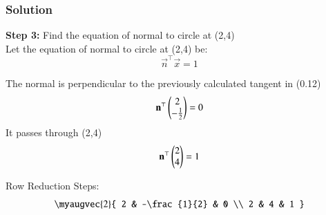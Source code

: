 \documentclass{beamer}
\numberwithin{equation}{section}
\begin{document}
\begin{frame}[fragile]
    \frametitle{Solution}
\textbf{Step 3:} Find the equation of normal to circle at (2,4)\\
Let the equation of normal to circle at (2,4) be:
\begin{equation}
\vec{n}^\top\vec{x} = 1
\end{equation}

The normal is perpendicular to the previously calculated tangent in (0.12)
\begin{equation}
\mathbf{n}^\top \begin{pmatrix}2 \\ -\frac{1}{2}\end{pmatrix} = 0
\end{equation}
\quad It passes through (2,4)
\begin{equation}
\mathbf{n}^\top \begin{pmatrix}2 \\ 4\end{pmatrix} = 1
\end{equation}

Row Reduction Steps:
\begin{equation}
\myaugvec{2}{
2 & -\frac{1}{2} & 0 \\
2 & 4 & 1
}
\end{equation}
\end{frame}
\end{document}

